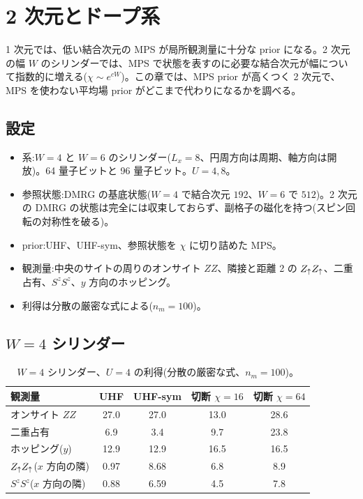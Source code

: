 \chapter{2 次元とドープ系}
\label{ch:2d}

1 次元では、低い結合次元の MPS が局所観測量に十分な prior になる。2 次元の幅 $W$ のシリンダーでは、MPS で状態を表すのに必要な結合次元が幅について指数的に増える($\chi\sim e^{cW}$)。この章では、MPS prior が高くつく 2 次元で、MPS を使わない平均場 prior がどこまで代わりになるかを調べる。

\section{設定}
\begin{itemize}
  \item 系:$W=4$ と $W=6$ のシリンダー($L_x=8$、円周方向は周期、軸方向は開放)。64 量子ビットと 96 量子ビット。$U=4,8$。
  \item 参照状態:DMRG の基底状態($W=4$ で結合次元 $192$、$W=6$ で $512$)。2 次元の DMRG の状態は完全には収束しておらず、副格子の磁化を持つ(スピン回転の対称性を破る)。
  \item prior:UHF、UHF-sym、参照状態を $\chi$ に切り詰めた MPS。
  \item 観測量:中央のサイトの周りのオンサイト $ZZ$、隣接と距離 2 の $Z_\uparrow Z_\uparrow$、二重占有、$S^zS^z$、$y$ 方向のホッピング。
  \item 利得は分散の厳密な式による($n_m=100$)。
\end{itemize}

\section{$W=4$ シリンダー}
\label{sec:w4}

\begin{table}[t]
\centering\small
\caption{$W=4$ シリンダー、$U=4$ の利得(分散の厳密な式、$n_m=100$)。}
\label{tab:w4}
\begin{tabular}{@{}lcccc@{}}
\toprule
観測量 & UHF & UHF-sym & 切断 $\chi{=}16$ & 切断 $\chi{=}64$ \\
\midrule
オンサイト $ZZ$ & 27.0 & 27.0 & 13.0 & 28.6 \\
二重占有 & 6.9 & 3.4 & 9.7 & 23.8 \\
ホッピング($y$) & 12.9 & 12.9 & 16.5 & 16.5 \\
$Z_\uparrow Z_\uparrow$($x$ 方向の隣) & 0.97 & 8.68 & 6.8 & 8.9 \\
$S^zS^z$($x$ 方向の隣) & 0.88 & 6.59 & 4.5 & 7.8 \\
\bottomrule
\end{tabular}
\end{table}

